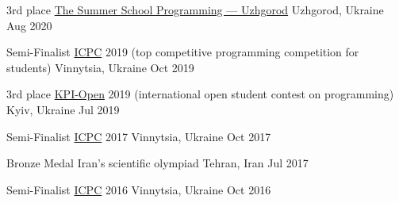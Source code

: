 




\begin{cvhonors}



\cvhonor
{3rd place}
{\href{http://codeschool.uzhnu.edu.ua/en}{The Summer School Programming --- Uzhgorod}}
{Uzhgorod, Ukraine}
{Aug 2020}


\cvhonor
{Semi-Finalist} %
{\href{https://icpc.global/}{ICPC} 2019 (top competitive programming competition for students)} %
{Vinnytsia, Ukraine} %
{Oct 2019} %


\cvhonor
{3rd place} %
{\href{https://open.kpi.ua/en}{KPI-Open} 2019 (international open student contest
on programming)} %
{Kyiv, Ukraine} %
{Jul 2019} %


\cvhonor
{Semi-Finalist} %
{\href{https://icpc.global/}{ICPC} 2017} %
{Vinnytsia, Ukraine} %
{Oct 2017} %


\cvhonor
{Bronze Medal} %
{Iran's scientific olympiad} %
{Tehran, Iran} %
{Jul 2017} %


\cvhonor
{Semi-Finalist} %
{\href{https://icpc.global/}{ICPC} 2016} %
{Vinnytsia, Ukraine} %
{Oct 2016} %


\end{cvhonors}
